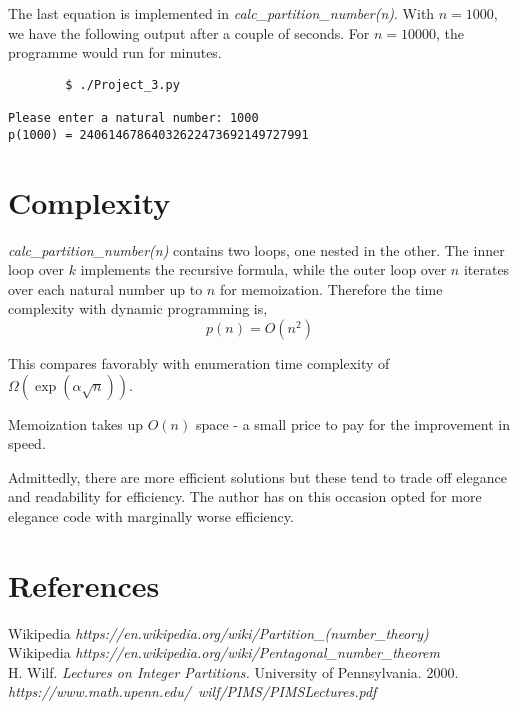 \documentclass{article}
\begin{document}
The last equation is implemented in \textit{calc\_partition\_number(n)}. With \(n=1000\), we have the following output after a couple of seconds. For \(n=10000\), the programme would run for minutes.

\begin{center}
	\begin{minipage}{0.7\linewidth}
    	\begin{commandline}
			\begin{verbatim}
		$ ./Project_3.py
        
Please enter a natural number: 1000
p(1000) = 24061467864032622473692149727991      
			\end{verbatim}
		\end{commandline}
	\end{minipage}
\end{center}



\section{Complexity}

\textit{calc\_partition\_number(n)} contains two loops, one nested in the other. The inner loop over \(k\) implements the recursive formula, while the outer loop over \(n\) iterates over each natural number up to \(n\) for memoization. Therefore the time complexity with dynamic programming is, 
\[p(n) = O(n^2)\]

This compares favorably with enumeration time complexity of \(\Omega (\exp(\alpha  \sqrt{n})) \).





Memoization takes up \(O(n)\) space - a small price to pay for the improvement in speed.

Admittedly, there are more efficient solutions but these tend to trade off elegance and readability for efficiency. The author has on this occasion opted for more elegance code with marginally worse efficiency.

\section*{References} %

Wikipedia \textit{https://en.wikipedia.org/wiki/Partition\_(number\_theory)}\\
Wikipedia \textit{https://en.wikipedia.org/wiki/Pentagonal\_number\_theorem}\\
H. Wilf. \textit{Lectures on Integer Partitions.} University of Pennsylvania. 2000. \textit{https://www.math.upenn.edu/~wilf/PIMS/PIMSLectures.pdf}

\end{document}
